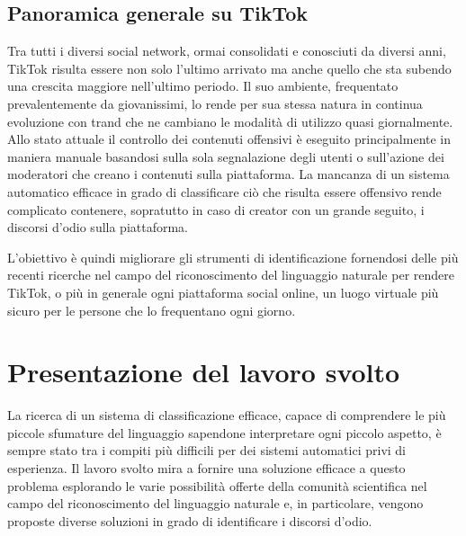 \subsection{Panoramica generale su TikTok}
    Tra tutti i diversi social network, ormai consolidati e conosciuti da diversi anni, TikTok risulta essere non solo l'ultimo arrivato ma anche quello che sta subendo una crescita maggiore nell'ultimo periodo. Il suo ambiente, frequentato prevalentemente da giovanissimi, lo rende per sua stessa natura in continua evoluzione con trand che ne cambiano le modalità di utilizzo quasi giornalmente. Allo stato attuale il controllo dei contenuti offensivi è eseguito principalmente in maniera manuale basandosi sulla sola segnalazione degli utenti o sull'azione dei moderatori che creano i contenuti sulla piattaforma.
    La mancanza di un sistema automatico efficace in grado di classificare ciò che risulta essere offensivo rende complicato contenere, sopratutto in caso di creator con un grande seguito, i discorsi d'odio sulla piattaforma.

    L'obiettivo è quindi migliorare gli strumenti di identificazione fornendosi delle più recenti ricerche nel campo del riconoscimento del linguaggio naturale per rendere TikTok, o più in generale ogni piattaforma social online, un luogo virtuale più sicuro per le persone che lo frequentano ogni giorno.

\section{Presentazione del lavoro svolto}

La ricerca di un sistema di classificazione efficace, capace di comprendere le più piccole sfumature del linguaggio sapendone interpretare ogni piccolo aspetto, è sempre stato tra i compiti più difficili per dei sistemi automatici privi di esperienza. Il lavoro svolto mira a fornire una soluzione efficace a questo problema esplorando le varie possibilità offerte della comunità scientifica nel campo del riconoscimento del linguaggio naturale e, in particolare, vengono proposte diverse soluzioni in grado di identificare i discorsi d'odio. 

